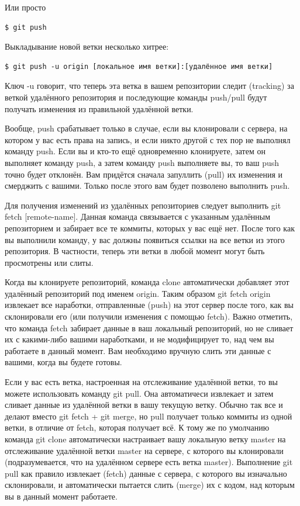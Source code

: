 \documentclass[a5paper]{article}
\begin{document}
Или просто

\begin{verbatim}
$ git push
\end{verbatim}

Выкладывание новой ветки несколько хитрее:

\begin{verbatim}
$ git push -u origin [локальное имя ветки]:[удалённое имя ветки]
\end{verbatim}

Ключ -u говорит, что теперь эта ветка в вашем репозитории следит (tracking) за веткой удалённого репозитория и последующие команды push/pull будут получать изменения из правильной удалённой ветки.

Вообще, push срабатывает только в случае, если вы клонировали с сервера, на котором у вас есть права на запись, и если никто другой с тех пор не выполнял команду push. Если вы и кто-то ещё одновременно клонируете, затем он выполняет команду push, а затем команду push выполняете вы, то ваш push точно будет отклонён. Вам придётся сначала запуллить (pull) их изменения и смерджить с вашими. Только после этого вам будет позволено выполнить push.

Для получения изменений из удалённых репозиториев следует выполнить git fetch [remote-name]. Данная команда связывается с указанным удалённым репозиторием и забирает все те коммиты, которых у вас ещё нет. После того как вы выполнили команду, у вас должны появиться ссылки на все ветки из этого репозитория. В частности, теперь эти ветки в любой момент могут быть просмотрены или слиты.

Когда вы клонируете репозиторий, команда clone автоматически добавляет этот удалённый репозиторий под именем origin. Таким образом git fetch origin извлекает все наработки, отправленные (push) на этот сервер после того, как вы склонировали его (или получили изменения с помощью fetch). Важно отметить, что команда fetch забирает данные в ваш локальный репозиторий, но не сливает их с какими-либо вашими наработками, и не модифицирует то, над чем вы работаете в данный момент. Вам необходимо вручную слить эти данные с вашими, когда вы будете готовы.

Если у вас есть ветка, настроенная на отслеживание удалённой ветки, то вы можете использовать команду git pull. Она автоматичеси извлекает и затем сливает данные из удалённой ветки в вашу текущую ветку. Обычно так все и делают вместо git fetch + git merge, но pull получает только коммиты из одной ветки, в отличие от fetch, которая получает всё. К тому же по умолчанию команда git clone автоматически настраивает вашу локальную ветку master на отслеживание удалённой ветки master на сервере, с которого вы клонировали (подразумевается, что на удалённом сервере есть ветка master). Выполнение git pull как правило извлекает (fetch) данные с сервера, с которого вы изначально склонировали, и автоматически пытается слить (merge) их с кодом, над которым вы в данный момент работаете.
\end{document}
